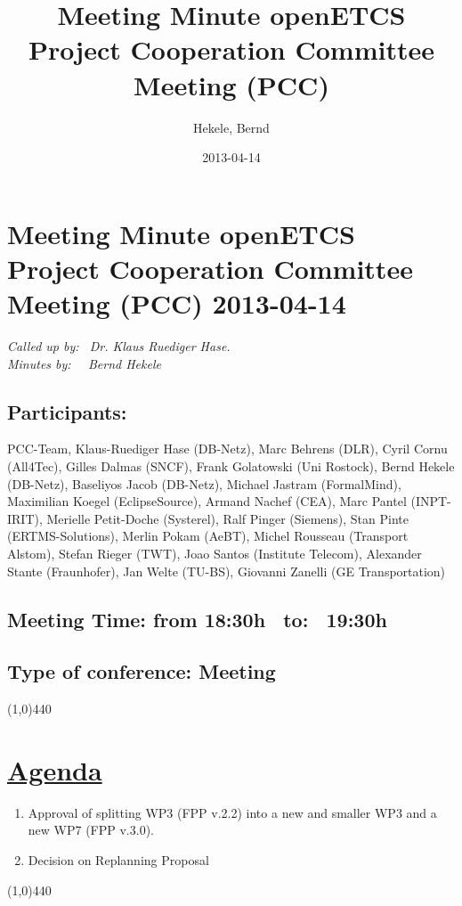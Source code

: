 \documentclass[a4paper]{article}
\title{Meeting Minute openETCS Project Cooperation Committee Meeting (PCC)}
\author{Hekele, Bernd}
\date{2013-04-14}
\begin{document}
\section*{\large{Meeting Minute openETCS Project Cooperation Committee Meeting (PCC) 2013-04-14}}

\emph{Called up by: \ Dr. Klaus Ruediger Hase.}\\
\emph{Minutes by: \ \  Bernd Hekele}


\subsection*{Participants:} PCC-Team, 
Klaus-Ruediger Hase (DB-Netz), 
Marc Behrens (DLR), 
Cyril Cornu (All4Tec),
Gilles Dalmas (SNCF),
Frank Golatowski (Uni Rostock), 
Bernd Hekele (DB-Netz),
Baseliyos Jacob (DB-Netz),
Michael Jastram (FormalMind), 
Maximilian Koegel (EclipseSource),
Armand Nachef (CEA),
Marc Pantel (INPT-IRIT),
Merielle Petit-Doche (Systerel),
Ralf Pinger (Siemens),
Stan Pinte (ERTMS-Solutions),
Merlin Pokam (AeBT),
Michel Rousseau (Transport Alstom),
Stefan Rieger (TWT),
Joao Santos (Institute Telecom),
Alexander Stante (Fraunhofer),
Jan Welte (TU-BS),
Giovanni Zanelli (GE Transportation)\\

\subsection*{Meeting Time: from 18:30h \ to: \ 19:30h}

\subsection*{Type of conference: Meeting}

\line(1,0){440}
\section*{\underline{Agenda}}
\begin{enumerate}

\item Approval of splitting WP3 (FPP v.2.2) into a new and smaller WP3 and a new WP7 (FPP v.3.0).
\item Decision on Replanning Proposal

\end{enumerate}
\line(1,0){440}
\end{document}
